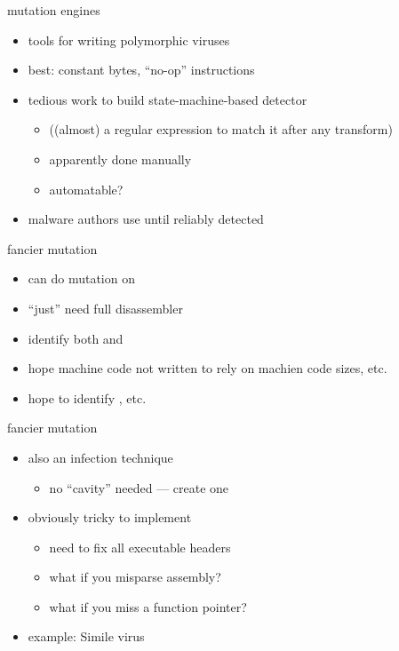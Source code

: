 \begin{frame}{mutation engines}
    \begin{itemize}
    \item tools for writing polymorphic viruses
    \item best:  constant bytes,  ``no-op'' instructions
    \item tedious work to build state-machine-based detector
        \begin{itemize}
        \item ((almost) a regular expression to match it after any transform)
        \item apparently done manually
        \item automatable?
        \end{itemize}
    \item malware authors use until reliably detected
    \end{itemize}
\end{frame}


\begin{frame}[fragile,label=fancyMut]{fancier mutation}
    \begin{itemize}
    \item can do mutation on 
    \vspace{.5cm}
    \item ``just'' need full disassembler
    \item identify both  and 
    \item hope machine code not written to rely on machien code sizes, etc.
    \item hope to identify , etc.
    \end{itemize}
\end{frame}

\begin{frame}{fancier mutation}
    \begin{itemize}
    \item also an infection technique
        \begin{itemize}
        \item no ``cavity'' needed --- create one
        \end{itemize}
    \item obviously tricky to implement
        \begin{itemize}
        \item need to fix all executable headers
        \item what if you misparse assembly?
        \item what if you miss a function pointer?
        \end{itemize}
    \item example: Simile virus
    \end{itemize}
\end{frame}

